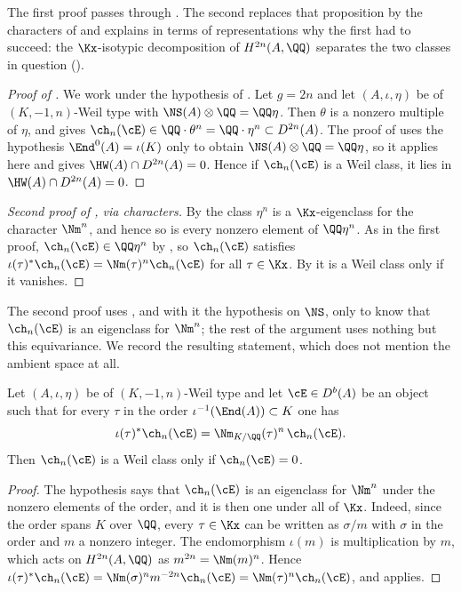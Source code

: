 The first proof passes through . The second replaces that
proposition by the characters of  and explains in terms
of representations why the first had to succeed: the $\Kx$-isotypic
decomposition of $H^{2n}(A,\QQ)$ separates the two classes in question
().

\begin{proof}[Proof of ]
We work under the hypothesis of . Let $g=2n$ and let
$(A,\iota,\eta)$ be of $(K,-1,n)$-Weil type with
$\NS(A)\otimes\QQ=\QQ\eta$. Then $\theta$ is a nonzero multiple of $\eta$,
and  gives
$\ch_{n}(\cE)\in\QQ\cdot\theta^{n}=\QQ\cdot\eta^{n}\subset D^{2n}(A)$. The
proof of  uses the hypothesis $\End^{0}(A)=\iota(K)$ only
to obtain $\NS(A)\otimes\QQ=\QQ\eta$, so it applies here and gives
$\HW(A)\cap D^{2n}(A)=0$. Hence if $\ch_{n}(\cE)$ is a Weil class, it lies in
$\HW(A)\cap D^{2n}(A)=0$.
\end{proof}

\begin{proof}[Second proof of , via characters]
By  the class $\eta^{n}$ is a $\Kx$-eigenclass for the
character $\Nm^{n}$, and hence so is every nonzero element of $\QQ\eta^{n}$.
As in the first proof, $\ch_{n}(\cE)\in\QQ\eta^{n}$ by
, so $\ch_{n}(\cE)$ satisfies
$\iota(\tau)^{*}\ch_{n}(\cE)=\Nm(\tau)^{n}\ch_{n}(\cE)$ for all $\tau\in\Kx$.
By  it is a Weil class only if it vanishes.
\end{proof}

The second proof uses , and with it the hypothesis on
$\NS$, only to know that $\ch_{n}(\cE)$ is an eigenclass for $\Nm^{n}$; the
rest of the argument uses nothing but this equivariance. We record the
resulting statement, which does not mention the ambient space at all.

\begin{theorem}\label{thm:equivsuffices}
Let $(A,\iota,\eta)$ be of $(K,-1,n)$-Weil type and let $\cE\in D^{b}(A)$ be
an object such that for every $\tau$ in the order
$\iota^{-1}(\End(A))\subset K$ one has
\[
  \iota(\tau)^{*}\ch_{n}(\cE)=\Nm_{K/\QQ}(\tau)^{n}\,\ch_{n}(\cE).
\]
Then $\ch_{n}(\cE)$ is a Weil class only if $\ch_{n}(\cE)=0$.
\end{theorem}

\begin{proof}
The hypothesis says that $\ch_{n}(\cE)$ is an eigenclass for $\Nm^{n}$ under
the nonzero elements of the order, and it is then one under all of $\Kx$.
Indeed, since the order spans $K$ over $\QQ$, every $\tau\in\Kx$ can be
written as $\sigma/m$ with $\sigma$ in the order and $m$ a nonzero integer.
The endomorphism $\iota(m)$ is multiplication by $m$, which acts on
$H^{2n}(A,\QQ)$ as $m^{2n}=\Nm(m)^{n}$. Hence
$\iota(\tau)^{*}\ch_{n}(\cE)=\Nm(\sigma)^{n}m^{-2n}\ch_{n}(\cE)
=\Nm(\tau)^{n}\ch_{n}(\cE)$, and  applies.
\end{proof}

